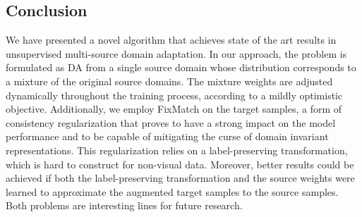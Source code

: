 \subsection{Conclusion}
\label{sec:modafm_conclusion}
We have presented a novel algorithm that achieves state of the art results in unsupervised multi-source domain adaptation. In our approach, the problem is formulated as DA from a single source domain whose distribution corresponds to a mixture of the original source domains. The mixture weights are adjusted dynamically throughout the training process, according to a mildly optimistic objective. Additionally, we employ FixMatch on the target samples, a form of consistency regularization that proves to have a strong impact on the model performance and to be capable of mitigating the curse of domain invariant representations. This regularization relies on a label-preserving transformation, which is hard to construct for non-visual data. Moreover, better results could be achieved if both the label-preserving transformation and the source weights were learned to approximate the augmented target samples to the source samples. Both problems are interesting lines for future research.